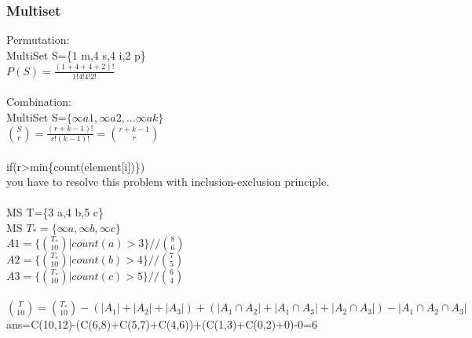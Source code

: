 \subsubsection{Multiset}
Permutation:\\
MultiSet S=\{1 m,4 s,4 i,2 p\}\\
$P(S)=\frac{(1+4+4+2)!}{1!4!4!2!}$\\
\\
Combination:\\
MultiSet S=$\{\infty a1,\infty a2,... \infty ak\}$\\
$\binom{S}{r}=\frac{(r+k-1)!}{r!(k-1)!}=\binom{r+k-1}{r}$\\
\\
if(r>min\{count(element[i])\})\\
    you have to resolve this problem with inclusion-exclusion principle.\\
\\
MS T=\{3 a,4 b,5 c\}\\
MS $T_*=\{\infty a,\infty b,\infty c\}$\\
$A1=\{\binom{T_*}{10}|count(a)>3\} // \binom{8}{6}$\\
$A2=\{\binom{T_*}{10}|count(b)>4\} // \binom{7}{5}$\\
$A3=\{\binom{T_*}{10}|count(c)>5\} // \binom{6}{4}$\\
\\
$\binom{T}{10}=\binom{T_*}{10}-(|A_1|+|A_2|+|A_3|)+(|A_1 \cap A_2|+|A_1 \cap A_3|+|A_2 \cap A_3|)-|A_1 \cap A_2 \cap A_3|$\\
ans=C(10,12)-(C(6,8)+C(5,7)+C(4,6))+(C(1,3)+C(0,2)+0)-0=6\\

